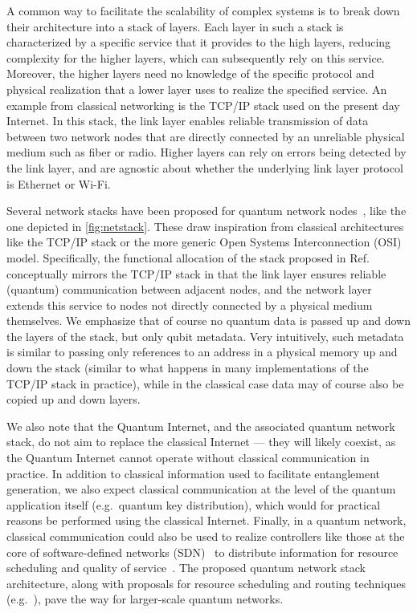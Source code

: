 A common way to facilitate the scalability of complex systems is to break down their architecture
into a stack of layers. Each layer in such a stack is characterized by a specific service that it
provides to the high layers, reducing complexity for the higher layers, which can subsequently rely
on this service. Moreover, the higher layers need no knowledge of the specific protocol and physical
realization that a lower layer uses to realize the specified service. An example from classical
networking is the TCP/IP stack used on the present day Internet. In this stack, the link layer
enables reliable transmission of data between two network nodes that are directly connected by an
unreliable physical medium such as fiber or radio. Higher layers can rely on errors being detected
by the link layer, and are agnostic about whether the underlying link layer protocol is Ethernet or
Wi-Fi.

Several network stacks have been proposed for quantum network nodes~\cite{dahlberg_2019_egp,
pirker_2019_quantum, kozlowski_2020_qnp}, like the one depicted in \cref{fig:netstack}. These draw
inspiration from classical architectures like the TCP/IP stack or the more generic Open Systems
Interconnection (OSI) model. Specifically, the functional allocation of the stack proposed in
Ref.~\cite{dahlberg_2019_egp} conceptually mirrors the TCP/IP stack in that the link layer ensures
reliable (quantum) communication between adjacent nodes, and the network layer extends this service
to nodes not directly connected by a physical medium themselves. We emphasize that of course no
quantum data is passed up and down the layers of the stack, but only qubit metadata. Very
intuitively, such metadata is similar to passing only references to an address in a physical memory
up and down the stack (similar to what happens in many implementations of the TCP/IP stack in
practice), while in the classical case data may of course also be copied up and down layers.

We also note that the Quantum Internet, and the associated quantum network stack, do not aim to
replace the classical Internet --- they will likely coexist, as the Quantum Internet cannot operate
without classical communication in practice. In addition to classical information used to facilitate
entanglement generation, we also expect classical communication at the level of the quantum
application itself (e.g.~quantum key distribution), which would for practical reasons be performed
using the classical Internet. Finally, in a quantum network, classical communication could also be
used to realize controllers like those at the core of software-defined networks
(SDN)~\cite{ferguson_2021_orion} to distribute information for resource scheduling and quality of
service~\cite{skrzypczyk_2021_arch}. The proposed quantum network stack architecture, along with
proposals for resource scheduling and routing techniques (e.g.~\cite{van_meter_2013_path,
caleffi_2017_optimal, gyongyosi_2018_decentralized, pant_2019_routing, chakraborty_2019_distributed,
shi_2020_concurrent, chakraborty_2020_entanglement, skrzypczyk_2021_arch}), pave the way for
larger-scale quantum networks.

